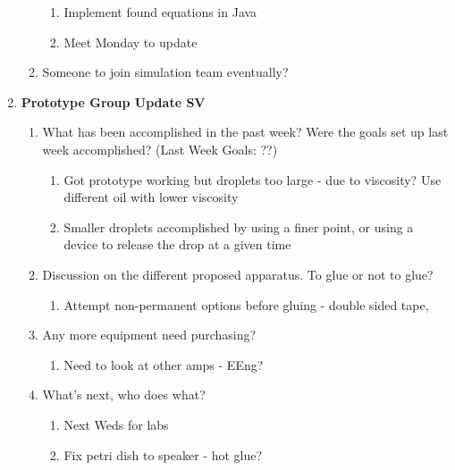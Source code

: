 \begin{enumerate}
\begin{enumerate}
\begin{enumerate}
\item  Implement found equations in Java

\item  Meet Monday to update
\end{enumerate}

\item  Someone to join simulation team eventually?\\
\end{enumerate}

\item  \textbf{Prototype Group Update SV}

\begin{enumerate}
\item What has been accomplished in the past week? Were the goals set up last week accomplished? (Last Week Goals: ??)

\begin{enumerate}
\item  Got prototype working but droplets too large - due to viscosity? Use different oil with lower viscosity

\item  Smaller droplets accomplished by using a finer point, or using a device to release the drop at a given time
\end{enumerate}

\item  Discussion on the different proposed apparatus. To glue or not to glue?

\begin{enumerate}
\item  Attempt non-permanent options before gluing - double sided tape, 
\end{enumerate}

\item  Any more equipment need purchasing?

\begin{enumerate}
\item  Need to look at other amps - EEng?
\end{enumerate}

\item  What's next, who does what?

\begin{enumerate}
\item  Next Weds for labs

\item  Fix petri dish to speaker - hot glue?


\end{enumerate}
\end{enumerate}
\end{enumerate}
